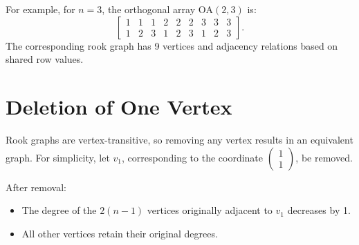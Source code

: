 \documentclass{article}
\begin{document}
For example, for \( n = 3 \), the orthogonal array \( \text{OA}(2, 3) \) is:
\[
\begin{bmatrix}
1 & 1 & 1 & 2 & 2 & 2 & 3 & 3 & 3 \\
1 & 2 & 3 & 1 & 2 & 3 & 1 & 2 & 3
\end{bmatrix}.
\]
The corresponding rook graph has 9 vertices and adjacency relations based on shared row values.

\section{Deletion of One Vertex}

Rook graphs are vertex-transitive, so removing any vertex results in an equivalent graph. For simplicity, let \( v_1 \), corresponding to the coordinate \( \begin{pmatrix} 1 \\ 1 \end{pmatrix} \), be removed. 

After removal:
\begin{itemize}
    \item The degree of the \( 2(n-1) \) vertices originally adjacent to \( v_1 \) decreases by 1.
    \item All other vertices retain their original degrees.
\end{itemize}
\end{document}
